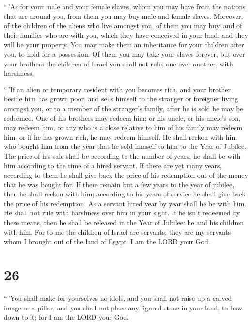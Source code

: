  ``\,'As for your male and your female slaves, whom you
may have from the nations that are around you, from them you may buy
male and female slaves.  Moreover, of the children of the
aliens who live amongst you, of them you may buy, and of their families
who are with you, which they have conceived in your land; and they will
be your property.  You may make them an inheritance for
your children after you, to hold for a possession. Of them you may take
your slaves forever, but over your brothers the children of Israel you
shall not rule, one over another, with harshness.

 ``\,'If an alien or temporary resident with you becomes
rich, and your brother beside him has grown poor, and sells himself to
the stranger or foreigner living amongst you, or to a member of the
stranger's family,  after he is sold he may be redeemed.
One of his brothers may redeem him;  or his uncle, or his
uncle's son, may redeem him, or any who is a close relative to him of
his family may redeem him; or if he has grown rich, he may redeem
himself.  He shall reckon with him who bought him from
the year that he sold himself to him to the Year of Jubilee. The price
of his sale shall be according to the number of years; he shall be with
him according to the time of a hired servant.  If there
are yet many years, according to them he shall give back the price of
his redemption out of the money that he was bought for. 
If there remain but a few years to the year of jubilee, then he shall
reckon with him; according to his years of service he shall give back
the price of his redemption.  As a servant hired year by
year shall he be with him. He shall not rule with harshness over him in
your sight.  If he isn't redeemed by these means, then he
shall be released in the Year of Jubilee: he and his children with him.
 For to me the children of Israel are servants; they are
my servants whom I brought out of the land of Egypt. I am the LORD your
God.

\hypertarget{section-25}{%
\section{26}\label{section-25}}

 ``\,'You shall make for yourselves no idols, and you
shall not raise up a carved image or a pillar, and you shall not place
any figured stone in your land, to bow down to it; for I am the LORD
your God.

